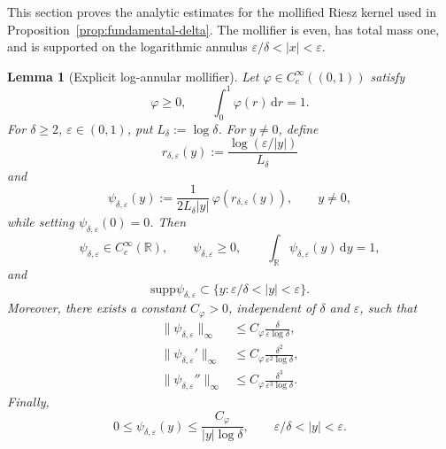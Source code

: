 \documentclass[11pt]{article}
\newtheorem{lemma}[theorem]{Lemma}
\newcommand{\R}{\mathbb{R}}
\newcommand{\1}{\mathbf{1}}
\newcommand{\dd}{\,\mathrm{d}}
\newcommand{\eps}{\varepsilon}
\newcommand{\supp}{\mathrm{supp}}
\begin{document}
This section proves the analytic estimates for the mollified Riesz kernel used in Proposition~\ref{prop:fundamental-delta}. The mollifier is even, has total mass one, and is supported on the logarithmic annulus $\eps/\delta<|x|<\eps$.

\begin{lemma}[Explicit log-annular mollifier]
\label{lem:explicit-mollifier}
Let $\varphi\in C_c^\infty((0,1))$ satisfy
\[
  \varphi\ge0,\qquad \int_0^1\varphi(r)\dd r=1.
\]
For $\delta\ge2$, $\eps\in(0,1)$, put $L_\delta:=\log\delta$. For $y\ne0$, define
\[
  r_{\delta,\eps}(y):=\frac{\log(\eps/|y|)}{L_\delta}
\]
and
\begin{equation}\label{eq:explicit-psi}
  \psi_{\delta,\eps}(y)
  :=\frac{1}{2L_\delta |y|}\,\varphi\!\left(r_{\delta,\eps}(y)\right),
  \qquad y\ne0,
\end{equation}
while setting $\psi_{\delta,\eps}(0)=0$. Then
\[
  \psi_{\delta,\eps}\in C_c^\infty(\R),\qquad
  \psi_{\delta,\eps}\ge0,
  \qquad
  \int_\R\psi_{\delta,\eps}(y)\dd y=1,
\]
and
\[
  \supp\psi_{\delta,\eps}\subset\{y:\eps/\delta<|y|<\eps\}.
\]
Moreover, there exists a constant $C_\varphi>0$, independent of $\delta$ and $\eps$, such that
\begin{align}
  \|\psi_{\delta,\eps}\|_\infty
  &\le C_\varphi\frac{\delta}{\eps\log\delta}, \label{eq:psi0-bound}\\
  \|\psi_{\delta,\eps}'\|_\infty
  &\le C_\varphi\frac{\delta^2}{\eps^2\log\delta}, \label{eq:psi1-bound}\\
  \|\psi_{\delta,\eps}''\|_\infty
  &\le C_\varphi\frac{\delta^3}{\eps^3\log\delta}. \label{eq:psi2-bound}
\end{align}
Finally,
\begin{equation}\label{eq:psi-log-bound}
  0\le \psi_{\delta,\eps}(y)
  \le \frac{C_\varphi}{|y|\log\delta},
  \qquad \eps/\delta<|y|<\eps.
\end{equation}
\end{lemma}
\end{document}
